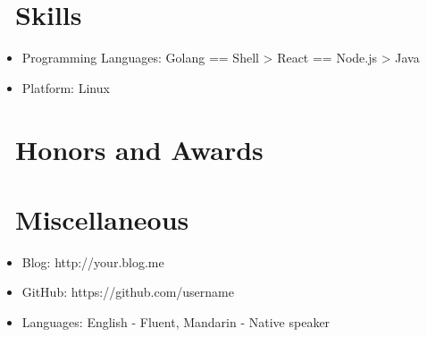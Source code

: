 \documentclass{resume}
\begin{document}
\section{\faCogs\ Skills}
\begin{itemize}[parsep=0.5ex]
  \item Programming Languages: Golang == Shell > React == Node.js > Java
  \item Platform: Linux
\end{itemize}

\section{\faHeartO\ Honors and Awards}

\section{\faInfo\ Miscellaneous}
\begin{itemize}[parsep=0.5ex]
  \item Blog: http://your.blog.me
  \item GitHub: https://github.com/username
  \item Languages: English - Fluent, Mandarin - Native speaker
\end{itemize}

%
%
\end{document}
